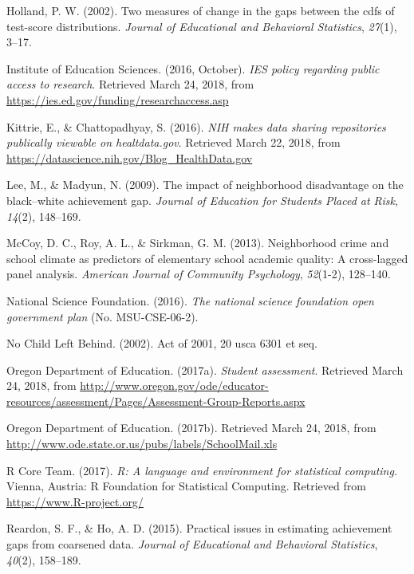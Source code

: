 \documentclass[man, fleqn, noextraspace]{apa6}
\theoremstyle{definition}
\theoremstyle{definition}
\theoremstyle{definition}
\theoremstyle{remark}
\begin{document}
\leavevmode\hypertarget{ref-holland02}{}%
Holland, P. W. (2002). Two measures of change in the gaps between the
cdfs of test-score distributions. \emph{Journal of Educational and
Behavioral Statistics}, \emph{27}(1), 3--17.

\leavevmode\hypertarget{ref-ies16}{}%
Institute of Education Sciences. (2016, October). \emph{IES policy
regarding public access to research}. Retrieved March 24, 2018, from
\url{https://ies.ed.gov/funding/researchaccess.asp}

\leavevmode\hypertarget{ref-nih_16}{}%
Kittrie, E., \& Chattopadhyay, S. (2016). \emph{NIH makes data sharing
repositories publically viewable on healtdata.gov}. Retrieved March 22,
2018, from \url{https://datascience.nih.gov/Blog_HealthData.gov}

\leavevmode\hypertarget{ref-lee09}{}%
Lee, M., \& Madyun, N. (2009). The impact of neighborhood disadvantage
on the black--white achievement gap. \emph{Journal of Education for
Students Placed at Risk}, \emph{14}(2), 148--169.

\leavevmode\hypertarget{ref-mccoy13}{}%
McCoy, D. C., Roy, A. L., \& Sirkman, G. M. (2013). Neighborhood crime
and school climate as predictors of elementary school academic quality:
A cross-lagged panel analysis. \emph{American Journal of Community
Psychology}, \emph{52}(1-2), 128--140.

\leavevmode\hypertarget{ref-nsf16}{}%
National Science Foundation. (2016). \emph{The national science
foundation open government plan} (No. MSU-CSE-06-2).

\leavevmode\hypertarget{ref-nclb02}{}%
No Child Left Behind. (2002). Act of 2001, 20 usca 6301 et seq.

\leavevmode\hypertarget{ref-or17a}{}%
Oregon Department of Education. (2017a). \emph{Student assessment}.
Retrieved March 24, 2018, from
\url{http://www.oregon.gov/ode/educator-resources/assessment/Pages/Assessment-Group-Reports.aspx}

\leavevmode\hypertarget{ref-or17b}{}%
Oregon Department of Education. (2017b). Retrieved March 24, 2018, from
\url{http://www.ode.state.or.us/pubs/labels/SchoolMail.xls}

\leavevmode\hypertarget{ref-r}{}%
R Core Team. (2017). \emph{R: A language and environment for statistical
computing}. Vienna, Austria: R Foundation for Statistical Computing.
Retrieved from \url{https://www.R-project.org/}

\leavevmode\hypertarget{ref-reardon15}{}%
Reardon, S. F., \& Ho, A. D. (2015). Practical issues in estimating
achievement gaps from coarsened data. \emph{Journal of Educational and
Behavioral Statistics}, \emph{40}(2), 158--189.
\end{document}
